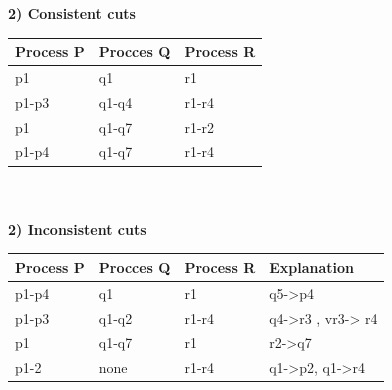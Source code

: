 \textbf{2) Consistent cuts}\\
\begin{tabular}{ l l l }
Process P & Procces Q & Process R \\[0.1cm]
\hline 
p1 		& q1 	& r1 	\\[0.1cm]
p1-p3 	& q1-q4 & r1-r4 \\[0.1cm]
p1 		& q1-q7 & r1-r2 \\[0.1cm]
p1-p4 	& q1-q7 & r1-r4 \\[0.1cm]
\hline 
\end{tabular}\\\\

\textbf{2) Inconsistent cuts}\\
\begin{tabular}{ l l l | l }
Process P & Procces Q & Process R & Explanation \\[0.1cm]
\hline 
p1-p4 	& q1 	& r1 	& q5->p4 			\\[0.1cm]
p1-p3 	& q1-q2 & r1-r4 & q4->r3 , vr3-> r4 \\[0.1cm]
p1 		& q1-q7 & r1 	& r2->q7 			\\[0.1cm]
p1-2	& none 	& r1-r4 & q1->p2, q1->r4 	\\[0.1cm]
\hline 
\end{tabular}\\\\

\newpage